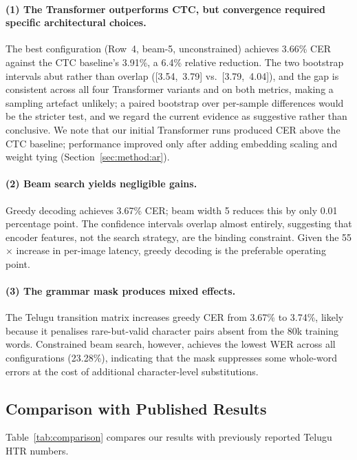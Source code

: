 \documentclass[pdflatex,sn-mathphys-num]{sn-jnl}
\begin{document}
\paragraph{(1) The Transformer outperforms CTC, but convergence required specific architectural choices.} The best configuration (Row~4, beam-5, unconstrained) achieves 3.66\% CER against the CTC baseline's 3.91\%, a 6.4\% relative reduction. The two bootstrap intervals abut rather than overlap ([3.54,~3.79] vs.~[3.79,~4.04]), and the gap is consistent across all four Transformer variants and on both metrics, making a sampling artefact unlikely; a paired bootstrap over per-sample differences would be the stricter test, and we regard the current evidence as suggestive rather than conclusive. We note that our initial Transformer runs produced CER above the CTC baseline; performance improved only after adding embedding scaling and weight tying (Section~\ref{sec:method:ar}).

\paragraph{(2) Beam search yields negligible gains.} Greedy decoding achieves 3.67\% CER; beam width 5 reduces this by only 0.01 percentage point. The confidence intervals overlap almost entirely, suggesting that encoder features, not the search strategy, are the binding constraint. Given the 55$\times$ increase in per-image latency, greedy decoding is the preferable operating point.

\paragraph{(3) The grammar mask produces mixed effects.} The Telugu transition matrix increases greedy CER from 3.67\% to 3.74\%, likely because it penalises rare-but-valid character pairs absent from the 80k training words. Constrained beam search, however, achieves the lowest WER across all configurations (23.28\%), indicating that the mask suppresses some whole-word errors at the cost of additional character-level substitutions.

\subsection{Comparison with Published Results}\label{sec:results:comparison}

Table~\ref{tab:comparison} compares our results with previously reported Telugu HTR numbers.
\end{document}
